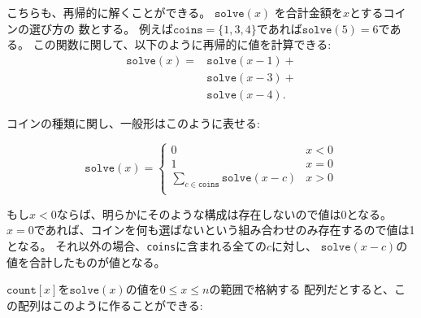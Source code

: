 こちらも、再帰的に解くことができる。
$\texttt{solve}(x)$ を合計金額を$x$とするコインの選び方の
数とする。
例えば$\texttt{coins}=\{1,3,4\}$であれば$\texttt{solve}(5)=6$である。
この関数に関して、以下のように再帰的に値を計算できる:
\begin{equation*}
\begin{split}
\texttt{solve}(x) = & \texttt{solve}(x-1) + \\
                    & \texttt{solve}(x-3) + \\
                    & \texttt{solve}(x-4)  .
\end{split}
\end{equation*}

\begin{comment}
Then, the general recursive function is as follows:
\end{comment}

コインの種類に関し、一般形はこのように表せる:

\begin{equation*}
    \texttt{solve}(x) = \begin{cases}
               0               & x < 0\\
               1               & x = 0\\
               \sum_{c \in \texttt{coins}} \texttt{solve}(x-c) & x > 0 \\
           \end{cases}
\end{equation*}

\begin{comment}
If $x<0$, the value is 0, because there are no solutions.
If $x=0$, the value is 1, because there is only one way
to form an empty sum.
Otherwise we calculate the sum of all values
of the form $\texttt{solve}(x-c)$ where $c$ is in \texttt{coins}.

The following code constructs an array
$\texttt{count}$ such that
$\texttt{count}[x]$ equals
the value of $\texttt{solve}(x)$
for $0 \le x \le n$:
\end{comment}

もし$x<0$ならば、明らかにそのような構成は存在しないので値は0となる。
$x=0$であれば、コインを何も選ばないという組み合わせのみ存在するので値は1となる。
それ以外の場合、\texttt{coins}に含まれる全ての$c$に対し、
$\texttt{solve}(x-c)$の値を合計したものが値となる。

$\texttt{count}[x]$を$\texttt{solve}(x)$の値を$0 \le x \le n$の範囲で格納する
配列だとすると、この配列はこのように作ることができる:


